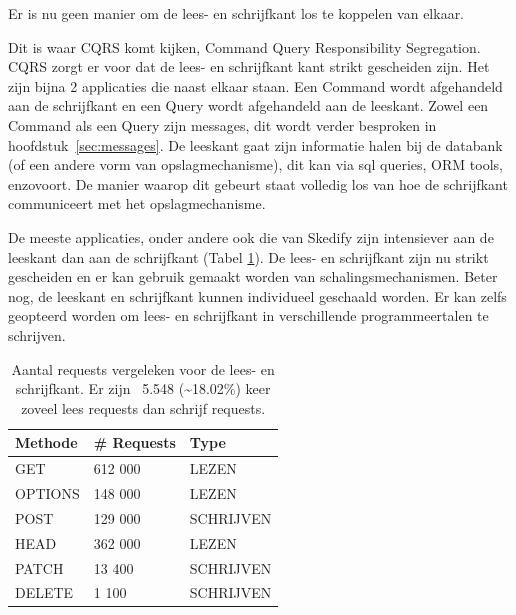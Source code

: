 
Er is nu geen manier om de lees- en schrijfkant los te koppelen van elkaar.

Dit is waar CQRS komt kijken, Command Query Responsibility Segregation. CQRS zorgt er voor dat de lees- en schrijfkant kant strikt gescheiden zijn. Het zijn bijna 2 applicaties die naast elkaar staan. Een Command wordt afgehandeld aan de schrijfkant en een Query wordt afgehandeld aan de leeskant. Zowel een Command als een Query zijn messages, dit wordt verder besproken in hoofdstuk~\ref{sec:messages}. De leeskant gaat zijn informatie halen bij de databank (of een andere vorm van opslagmechanisme), dit kan via sql queries, ORM tools, enzovoort. De manier waarop dit gebeurt staat volledig los van hoe de schrijfkant communiceert met het opslagmechanisme. 

De meeste applicaties, onder andere ook die van Skedify zijn intensiever aan de leeskant dan aan de schrijfkant (Tabel \ref{cqrs-read-writes}). De lees- en schrijfkant zijn nu strikt gescheiden en er kan gebruik gemaakt worden van schalingsmechanismen. Beter nog, de leeskant en schrijfkant kunnen individueel geschaald worden. Er kan zelfs geopteerd worden om lees- en schrijfkant in verschillende programmeertalen te schrijven.

\begin{table}[h]
\centering
\caption[Aantal requests vergeleken voor de lees- en schrijfkant.]{Aantal requests vergeleken voor de lees- en schrijfkant. Er zijn ~5.548 (\textasciitilde18.02\%) keer zoveel lees requests dan schrijf requests.}
\begin{tabular}{lll} \toprule
Methode & \# Requests & Type        \\ \midrule
GET     & 612 000     & LEZEN       \\
OPTIONS & 148 000     & LEZEN       \\
POST    & 129 000     & SCHRIJVEN   \\
HEAD    & 362 000     & LEZEN       \\
PATCH   & 13 400      & SCHRIJVEN   \\
DELETE  & 1 100       & SCHRIJVEN   \\ \bottomrule
\end{tabular}
\label{cqrs-read-writes}
\end{table}

